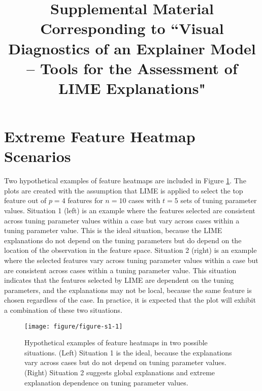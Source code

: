 \documentclass[9pt]{article}\usepackage[]{graphicx}\usepackage[]{color}
\title{Supplemental Material Corresponding to ``Visual Diagnostics of an Explainer Model -- Tools for the Assessment of LIME Explanations"}
\date{}
\newenvironment{knitrout}{}{} %
\begin{document}
\maketitle



\section{Extreme Feature Heatmap Scenarios} \label{feat-heat-ex}

Two hypothetical examples of feature heatmaps are included in Figure \ref{fig:figure-s1}. The plots are created with the assumption that LIME is applied to select the top feature out of $p=4$  features for $n=10$ cases with $t=5$ sets of tuning parameter values. Situation 1 (left) is an example where the features selected are consistent across tuning parameter values within a case but vary across cases within a tuning parameter value. This is the ideal situation, because the LIME explanations do not depend on the tuning parameters but do depend on the location of the observation in the feature space. Situation 2 (right) is an example where the selected features vary across tuning parameter values within a case but are consistent across cases within a tuning parameter value. This situation indicates that the features selected by LIME are dependent on the tuning parameters, and the explanations may not be  local, because the same feature is chosen regardless of the case. In practice, it is expected that the plot will exhibit a combination of these two situations.

\vspace{0.5cm}

\renewcommand{\thefigure}{S1}
\begin{figure}[!h]
\begin{knitrout}
\color{fgcolor}

{\centering \texttt{[image: figure/figure-s1-1]} 

}



\end{knitrout}
\caption{Hypothetical examples of feature heatmaps in two possible situations. (Left) Situation 1 is the ideal, because the explanations vary across cases but do not depend on tuning parameter values. (Right) Situation 2 suggests global explanations and extreme explanation dependence on tuning parameter values.}
\label{fig:figure-s1}
\end{figure}
\end{document}

